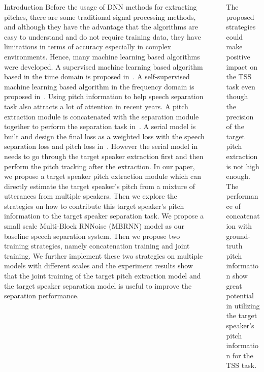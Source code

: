 \documentclass[final]{beamer}
\newlength{\sepwidth}
\newlength{\colwidth}
\newcommand{\separatorcolumn}{\begin{column}{\sepwidth}\end{column}}
\begin{document}
\begin{frame}[t]
\begin{columns}[t]
\begin{column}{\colwidth}
\begin{block}{Introduction}
                    Before the usage of DNN methods for extracting pitches, there are some traditional signal processing methods, and although they have the advantage that the algorithms are easy to understand and do not require training data, they have limitations in terms of accuracy especially in complex environments. Hence, many machine learning based algorithms were developed.
                    A supervised machine learning based algorithm based in the time domain is proposed in~\cite{crepe}.
                    A self-supervised machine learning based algorithm in the frequency domain is proposed in~\cite{spice}.
                    Using pitch information to help speech separation task also attracts a lot of attention in recent years.
                    A pitch extraction module is concatenated with the separation module together to perform the separation task in~\cite{pitch_aware}.
                    A serial model is built and design the final loss as a weighted loss with the speech separation loss and pitch loss in~\cite{serial}. However the serial model in~\cite{serial} needs to go through the target speaker extraction first and then perform the pitch tracking after the extraction.
                    In our paper, we propose a target speaker pitch extraction module which can directly estimate the target speaker's pitch from a mixture of utterances from multiple speakers.
                    Then we explore the strategies on how to contribute this target speaker's pitch information to the target speaker separation task.
                    We propose a small scale Multi-Block RNNoise (MBRNN) model as our baseline speech separation system.
                    Then we propose two training strategies, namely concatenation training and joint training.
                    We further implement these two strategies on multiple models with different scales and the experiment results show that the joint training of the target pitch extraction model and the target speaker separation model is useful to improve the separation performance.
                \end{block}

            \end{column}

            \separatorcolumn

            \begin{column}{\colwidth}
                \begin{block}{}
                    The proposed strategies could make positive impact on the TSS task even though the precision of the target pitch extraction is not high enough.
                    The performance of concatenation with ground-truth pitch information show great potential in utilizing the target speaker's pitch information for the TSS task.


\end{block}
\end{column}
\end{columns}
\end{frame}
\end{document}
